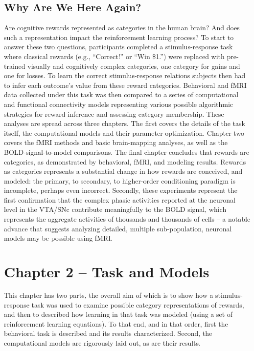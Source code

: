 \documentclass[doc,12pt]{apa}        %
\begin{document}
\subsection{Why Are We Here Again?}
\label{sub:goals}
Are cognitive rewards represented as categories in the human brain?  And does such a representation impact the reinforcement learning process?  To start to answer these two questions, participants completed a stimulus-response task where classical rewards (e.g., ``Correct!'' or ``Win \$1.'') were replaced with pre-trained visually and cognitively complex categories, one category for gains and one for losses.  To learn the correct stimulus-response relations subjects then had to infer each outcome's value from these reward categories.  Behavioral and fMRI data collected under this task was then compared to a series of computational and functional connectivity models representing various possible algorithmic strategies for reward inference and assessing category membership.  These analyses are spread across three chapters.  The first covers the details of the task itself, the computational models and their parameter optimization.  Chapter two covers the fMRI methods and basic brain-mapping analyses, as well as the BOLD-signal-to-model comparisons.  The final chapter concludes that rewards are categories, as demonstrated by behavioral, fMRI, and modeling results.  Rewards as categories represents a substantial change in how rewards are conceived, and modeled: the primary, to secondary, to higher-order conditioning paradigm is incomplete, perhaps even incorrect.   Secondly, these experiments represent the first confirmation that the complex phasic activities reported at the neuronal level in the VTA/SNc \cite{Kim:2006p1063, Matsumoto:2009p7219,Smith:2011p9101} contribute meaningfully to the BOLD signal, which represents the aggregate activities of thousands and thousands of cells -- a notable advance that suggests analyzing detailed, multiple sub-population, neuronal models may be possible using fMRI.

\newpage
\section{Chapter 2 -- Task and Models} %
\label{sec:task_and_models}
This chapter has two parts, the overall aim of which is to show how a stimulus-response task was used to examine possible category representations of rewards, and then to described how learning in that task was modeled (using a set of reinforcement learning equations).  To that end, and in that order, first the behavioral task is described and its results characterized.  Second, the computational models are rigorously laid out, as are their results.
\end{document}
